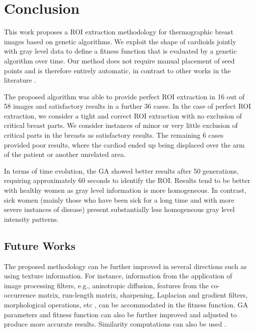 \documentclass[conference]{IEEEtran}
\begin{document}
\section{Conclusion}
\label{sec:conclusion}
This work proposes a ROI extraction methodology for thermographic breast images based on genetic algorithms. We exploit the shape of cardioids jointly with gray level data to define a fitness function that is evaluated by a genetic algorithm over time. Our method does not require manual placement of seed points and is therefore entirely automatic, in contrast to other works in the literature \cite{suganthi14}.


The proposed algorithm was able to provide perfect ROI extraction in 16 out of 58 images and satisfactory results in a further 36 cases. In the case of perfect ROI extraction, we consider a tight and correct ROI extraction with no exclusion of critical breast parts. We consider instances of minor or very little exclusion of critical parts in the breasts as satisfactory results.  The remaining 6 cases provided poor results, where the cardiod ended up being displaced over the arm of the patient or another unrelated area.

In terms of time evolution, the GA showed better results after 50 generations, requiring approximately 60 seconds to identify the ROI. Results tend to be better with healthy women as gray level information is more homogeneous. In contrast, sick women (mainly those who have been sick for a long time and with more severe instances of disease) present substantially less homogeneous gray level intensity patterns.



\subsection{Future Works}

The proposed methodology can be further improved in several directions such as using texture information. For instance, information from the application of image processing filters, e.g., anisotropic diffusion, features from the co-occurrence matrix, run-length matrix, sharpening, Laplacian and gradient filters, morphological operations, etc \cite{novel16}, can be accommodated in the fitness function. GA parameters and fitness function can also be further improved and adjusted to produce more accurate results. Similarity computations can also be used \cite{combining18}.
\end{document}
